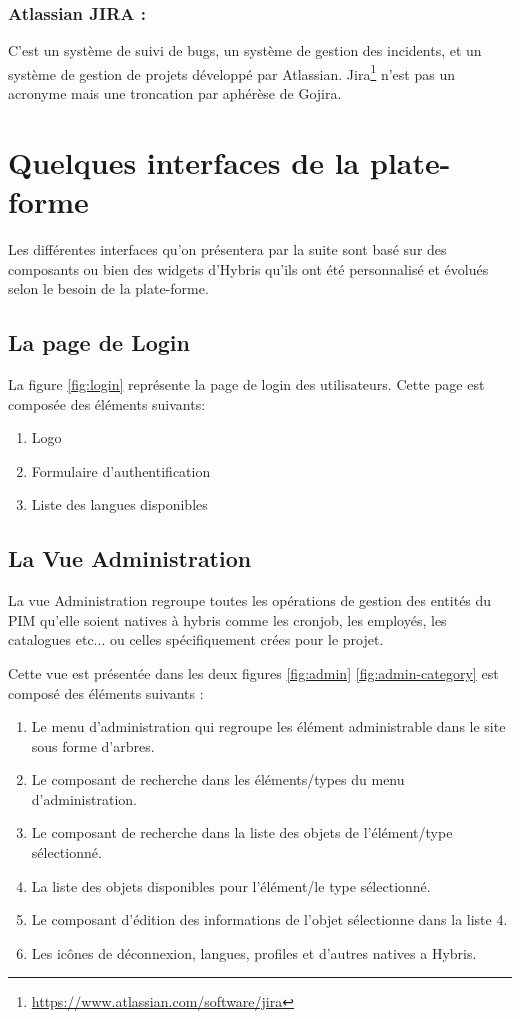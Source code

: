 \subsubsection{Atlassian JIRA :} C'est un système de suivi de bugs, un système de gestion des incidents, et un système de gestion de projets développé par Atlassian. Jira\footnote{\url{https://www.atlassian.com/software/jira}} n'est pas un acronyme mais une troncation par aphérèse de Gojira\cite{wiki:jira}.

\section{Quelques interfaces de la plate-forme}
Les différentes interfaces qu'on présentera par la suite sont basé sur des composants ou bien des widgets d'Hybris qu'ils ont été personnalisé et évolués selon le besoin de la plate-forme.

\subsection{La page de Login}
La figure \ref{fig:login}  représente la page de login des utilisateurs. Cette page est composée des éléments suivants:
\medskip
\begin{enumerate}
    \item Logo
    \smallskip
    \item Formulaire d'authentification
    \smallskip
    \item Liste des langues disponibles
\end{enumerate}
\medskip




\subsection{La Vue Administration}

La vue Administration regroupe toutes les opérations de gestion des entités du PIM qu'elle soient natives à hybris comme les cronjob, les employés, les catalogues etc... ou celles spécifiquement crées pour le projet.
\bigskip

Cette vue est présentée dans les deux figures \ref{fig:admin} \ref{fig:admin-category} est composé des éléments suivants :

\begin{enumerate}
    \item Le menu d'administration qui regroupe les élément administrable dans le site sous forme d'arbres.
    \medskip
    \item Le composant de recherche dans les éléments/types du menu d'administration.
    \medskip
    \item Le composant de recherche dans la liste des objets de l'élément/type sélectionné.
    \medskip
    \item La liste des objets disponibles pour l'élément/le type sélectionné.
    \medskip
    \item Le composant d'édition des informations de l'objet sélectionne dans la liste 4.
    \medskip
    \item Les icônes de déconnexion, langues, profiles et d'autres natives a Hybris. 
\end{enumerate}

